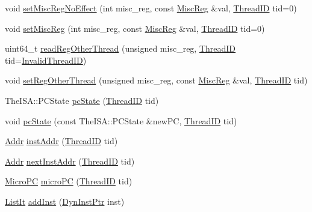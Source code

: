 \begin{DoxyCompactItemize}
\item 
void \hyperlink{classInOrderCPU_ab8dd4afdd4e652ca191b235505691f68}{setMiscRegNoEffect} (int misc\_\-reg, const \hyperlink{classInOrderCPU_aaf5f073a387db0556d1db4bcc45428bc}{MiscReg} \&val, \hyperlink{base_2types_8hh_ab39b1a4f9dad884694c7a74ed69e6a6b}{ThreadID} tid=0)
\item 
void \hyperlink{classInOrderCPU_a9b618db833e56fbb32246fe25716846f}{setMiscReg} (int misc\_\-reg, const \hyperlink{classInOrderCPU_aaf5f073a387db0556d1db4bcc45428bc}{MiscReg} \&val, \hyperlink{base_2types_8hh_ab39b1a4f9dad884694c7a74ed69e6a6b}{ThreadID} tid=0)
\item 
uint64\_\-t \hyperlink{classInOrderCPU_ab5092ae128090a3cac51e6f84c458e62}{readRegOtherThread} (unsigned misc\_\-reg, \hyperlink{base_2types_8hh_ab39b1a4f9dad884694c7a74ed69e6a6b}{ThreadID} tid=\hyperlink{base_2types_8hh_a192b210a26f038691d0f095d85dc0953}{InvalidThreadID})
\item 
void \hyperlink{classInOrderCPU_aeefa734eaa86cd9ffcbd59f4554b32a2}{setRegOtherThread} (unsigned misc\_\-reg, const \hyperlink{classInOrderCPU_aaf5f073a387db0556d1db4bcc45428bc}{MiscReg} \&val, \hyperlink{base_2types_8hh_ab39b1a4f9dad884694c7a74ed69e6a6b}{ThreadID} tid)
\item 
TheISA::PCState \hyperlink{classInOrderCPU_af486ac7476906f63fc6696b3e76a411b}{pcState} (\hyperlink{base_2types_8hh_ab39b1a4f9dad884694c7a74ed69e6a6b}{ThreadID} tid)
\item 
void \hyperlink{classInOrderCPU_a992a623bd3e0d79c4a361ee71c9d642d}{pcState} (const TheISA::PCState \&newPC, \hyperlink{base_2types_8hh_ab39b1a4f9dad884694c7a74ed69e6a6b}{ThreadID} tid)
\item 
\hyperlink{base_2types_8hh_af1bb03d6a4ee096394a6749f0a169232}{Addr} \hyperlink{classInOrderCPU_afae6152cf4b3a51162d6e64247c1ac09}{instAddr} (\hyperlink{base_2types_8hh_ab39b1a4f9dad884694c7a74ed69e6a6b}{ThreadID} tid)
\item 
\hyperlink{base_2types_8hh_af1bb03d6a4ee096394a6749f0a169232}{Addr} \hyperlink{classInOrderCPU_af1caba1f04cf2802d742d1a16b961e79}{nextInstAddr} (\hyperlink{base_2types_8hh_ab39b1a4f9dad884694c7a74ed69e6a6b}{ThreadID} tid)
\item 
\hyperlink{base_2types_8hh_adfb4d8b20c5abc8be73dd367b16f2d57}{MicroPC} \hyperlink{classInOrderCPU_aa295441afc0fa8f449dc1a0cb7c7b994}{microPC} (\hyperlink{base_2types_8hh_ab39b1a4f9dad884694c7a74ed69e6a6b}{ThreadID} tid)
\item 
\hyperlink{classInOrderCPU_a184cb829e22cc656acb41864f68f51ea}{ListIt} \hyperlink{classInOrderCPU_ad6588087f5ab8be4ed4bf3b86cbcd577}{addInst} (\hyperlink{classRefCountingPtr}{DynInstPtr} inst)

\end{DoxyCompactItemize}

